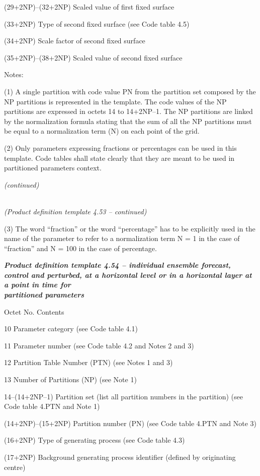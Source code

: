 (29+2NP)--(32+2NP) Scaled value of first fixed surface

(33+2NP) Type of second fixed surface (see Code table 4.5)

(34+2NP) Scale factor of second fixed surface

(35+2NP)--(38+2NP) Scaled value of second fixed surface

Notes:

(1) A single partition with code value PN from the partition set composed by the NP partitions is represented in the template. The code values of the NP partitions are expressed in octets 14 to 14+2NP--1. The NP partitions are linked by the normalization formula stating that the sum of all the NP partitions must be equal to a normalization term (N) on each point of the grid.

(2) Only parameters expressing fractions or percentages can be used in this template. Code tables shall state clearly that they are meant to be used in partitioned parameters context.

\emph{(continued)}

\emph{\\
(Product definition template 4.53 -- continued)}

(3) The word ``fraction'' or the word ``percentage'' has to be explicitly used in the name of the parameter to refer to a normalization term N = 1 in the case of ``fraction'' and N = 100 in the case of percentage.

\emph{\textbf{Product definition template 4.54 -- individual ensemble forecast, control and perturbed, at a horizontal level or in a horizontal layer at a point in time for\\
partitioned parameters}}

Octet No. Contents

10 Parameter category (see Code table 4.1)

11 Parameter number (see Code table 4.2 and Notes 2 and 3)

12 Partition Table Number (PTN) (see Notes 1 and 3)

13 Number of Partitions (NP) (see Note 1)

14--(14+2NP--1) Partition set (list all partition numbers in the partition) (see Code table 4.PTN and Note 1)

(14+2NP)--(15+2NP) Partition number (PN) (see Code table 4.PTN and Note 3)

(16+2NP) Type of generating process (see Code table 4.3)

(17+2NP) Background generating process identifier (defined by originating centre)

